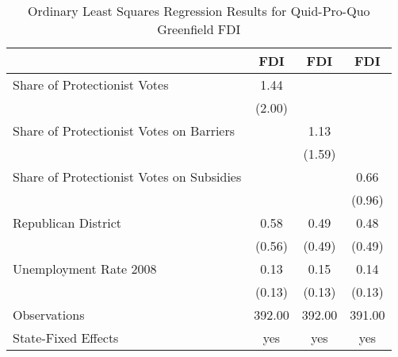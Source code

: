 \begin{table}[htbp]\centering
\def\sym#1{\ifmmode^{#1}\else\(^{#1}\)\fi}
\caption{Ordinary Least Squares Regression Results for Quid-Pro-Quo Greenfield FDI}
\begin{tabular}{l*{3}{c}}
\hline\hline
                    &         FDI   &         FDI   &         FDI   \\
\hline
Share of Protectionist Votes&        1.44   &               &               \\
                    &      (2.00)   &               &               \\
Share of Protectionist Votes on Barriers&               &        1.13   &               \\
                    &               &      (1.59)   &               \\
Share of Protectionist Votes on Subsidies&               &               &        0.66   \\
                    &               &               &      (0.96)   \\
Republican District &        0.58   &        0.49   &        0.48   \\
                    &      (0.56)   &      (0.49)   &      (0.49)   \\
Unemployment Rate 2008&        0.13   &        0.15   &        0.14   \\
                    &      (0.13)   &      (0.13)   &      (0.13)   \\
\hline
Observations        &      392.00   &      392.00   &      391.00   \\
State-Fixed Effects &         yes   &         yes   &         yes   \\
\hline\hline
\end{tabular}
\end{table}
